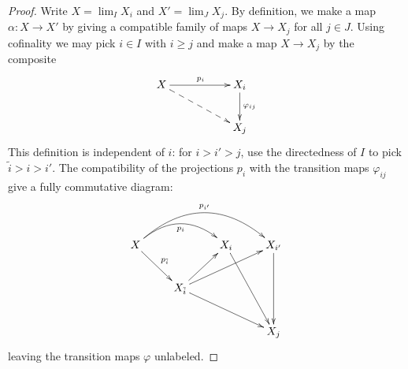         \begin{proof}
          Write $X=\lim_I X_i$ and $X'=\lim_J X_j$.
          By definition, we make a map $\alpha:X\rightarrow X'$ by giving a compatible family of maps $X\rightarrow X_j$ for all $j\in J$.
          Using cofinality we may pick $i\in I$ with $i\ge j$ and make a map $X\rightarrow X_j$ by the composite
          \begin{displaymath}
            \xymatrix{
              X \ar[rr]^{p_i} \ar@{-->}[drr] && X_i \ar[d]^{\varphi_{ij}} \\
              && X_j
            }
          \end{displaymath}
          This definition is independent of $i$: for $i>i'>j$, use the directedness of $I$ to pick $\tilde{i}>i>i'$.
          The compatibility of the projections $p_i$ with the transition maps $\varphi_{ij}$ give a fully commutative diagram:
          \begin{displaymath}
            \xymatrix{
              X \ar@/^20pt/[rr]_{p_i} \ar@/^30pt/[rrr]^{p_{i'}} \ar[dr]^{p_{\tilde{i}}} && X_i \ar[ddr] & X_{i'} \ar[dd] \\
              & X_{\tilde{i}} \ar[ur] \ar[urr] \ar[drr] \\
              &&& X_j
            }
          \end{displaymath}
          leaving the transition maps $\varphi$ unlabeled.


\end{proof}
